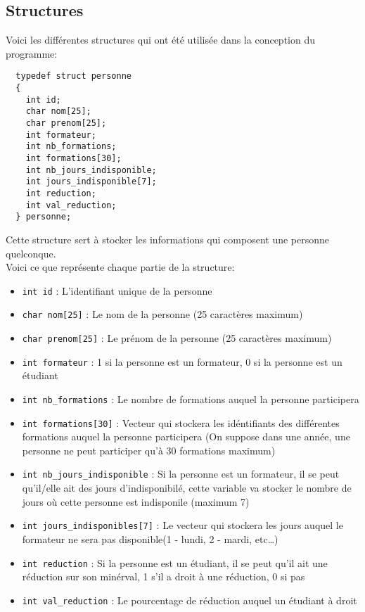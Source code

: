 \documentclass[11pt]{article}
\begin{document}
\subsection{Structures}
Voici les différentes structures qui ont été utilisée dans la conception du programme:

\begin{lstlisting}
  typedef struct personne
  {
    int id;
    char nom[25];
    char prenom[25];
    int formateur;
    int nb_formations;
    int formations[30];
    int nb_jours_indisponible;
    int jours_indisponible[7];
    int reduction;
    int val_reduction;
  } personne;
\end{lstlisting}

Cette structure sert à stocker les informations qui composent une personne quelconque.\\
Voici ce que représente chaque partie de la structure:
\begin{itemize}
\item \texttt{int id} : L'identifiant unique de la personne
\item \texttt{char nom[25]} : Le nom de la personne (25 caractères maximum)
\item \texttt{char prenom[25]} : Le prénom de la personne (25 caractères maximum)
\item \texttt{int formateur} : 1 si la personne est un formateur, 0 si la personne est un étudiant
\item \texttt{int nb\_formations} : Le nombre de formations auquel la personne participera
\item \texttt{int formations[30]} : Vecteur qui stockera les idéntifiants des différentes formations auquel la personne participera (On suppose dans une année, une personne ne peut participer qu'à 30 formations maximum)
\item \texttt{int nb\_jours\_indisponible} : Si la personne est un formateur, il se peut qu'il/elle ait des jours d'indisponibilé, cette variable va stocker le nombre de jours où cette personne est indisponile (maximum 7)
\item \texttt{int jours\_indisponibles[7]} : Le vecteur qui stockera les jours auquel le formateur ne sera pas disponible(1 - lundi, 2 - mardi, etc\ldots)
\item \texttt{int reduction} : Si la personne est un étudiant, il se peut qu'il ait une réduction sur son minérval, 1 s'il a droit à une réduction, 0 si pas
  \item \texttt{int val\_reduction} : Le pourcentage de réduction auquel un étudiant à droit
\end{itemize}
\end{document}
